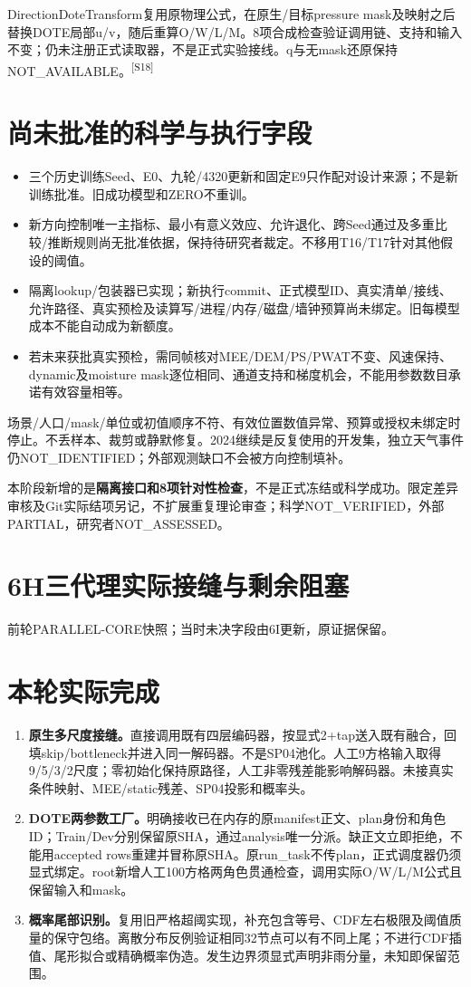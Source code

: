 \documentclass[UTF8,10.5pt,a4paper,fontset=none]{ctexart}
\newcommand{\evi}[1]{\textsuperscript{\color{muted}[#1]}}
\newcommand{\pageheading}[2]{\clearpage\section*{#1}\textcolor{muted}{#2}\par\vspace{3pt}}
\begin{document}
DirectionDoteTransform复用原物理公式，在原生/目标pressure mask及映射之后替换DOTE局部u/v，随后重算O/W/L/M。8项合成检查验证调用链、支持和输入不变；仍未注册正式读取器，不是正式实验接线。q与无mask还原保持NOT\_AVAILABLE。\evi{S18}

\section*{尚未批准的科学与执行字段}
\begin{itemize}
\item 三个历史训练Seed、E0、九轮/4320更新和固定E9只作配对设计来源；不是新训练批准。旧成功模型和ZERO不重训。
\item 新方向控制唯一主指标、最小有意义效应、允许退化、跨Seed通过及多重比较/推断规则尚无批准依据，保持待研究者裁定。不移用T16/T17针对其他假设的阈值。
\item 隔离lookup/包装器已实现；新执行commit、正式模型ID、真实清单/接线、允许路径、真实预检及读算写/进程/内存/磁盘/墙钟预算尚未绑定。旧每模型成本不能自动成为新额度。
\item 若未来获批真实预检，需同帧核对MEE/DEM/PS/PWAT不变、风速保持、dynamic及moisture mask逐位相同、通道支持和梯度机会，不能用参数数目承诺有效容量相等。
\end{itemize}

场景/人口/mask/单位或初值顺序不符、有效位置数值异常、预算或授权未绑定时停止。不丢样本、裁剪或静默修复。2024继续是反复使用的开发集，独立天气事件仍NOT\_IDENTIFIED；外部观测缺口不会被方向控制填补。

本阶段新增的是\textbf{隔离接口和8项针对性检查}，不是正式冻结或科学成功。限定差异审核及Git实际结项另记，不扩展重复理论审查；科学NOT\_VERIFIED，外部PARTIAL，研究者NOT\_ASSESSED。

\pageheading{6H\quad 三代理实际接缝与剩余阻塞}{前轮PARALLEL-CORE快照；当时未决字段由6I更新，原证据保留。}
\section*{本轮实际完成}
\begin{enumerate}[leftmargin=2em,itemsep=7pt]
\item \textbf{原生多尺度接缝。}直接调用既有四层编码器，按显式2+tap送入既有融合，回填skip/bottleneck并进入同一解码器。不是SP04池化。人工9方格输入取得9/5/3/2尺度；零初始化保持原路径，人工非零残差能影响解码器。未接真实条件映射、MEE/static残差、SP04投影和概率头。
\item \textbf{DOTE两参数工厂。}明确接收已在内存的原manifest正文、plan身份和角色ID；Train/Dev分别保留原SHA，通过analysis唯一分派。缺正文立即拒绝，不能用accepted rows重建并冒称原SHA。原run\_task不传plan，正式调度器仍须显式绑定。root新增人工100方格两角色贯通检查，调用实际O/W/L/M公式且保留输入和mask。
\item \textbf{概率尾部识别。}复用旧严格超阈实现，补充包含等号、CDF左右极限及阈值质量的保守包络。离散分布反例验证相同32节点可以有不同上尾；不进行CDF插值、尾形拟合或精确概率伪造。发生边界须显式声明非雨分量，未知即保留范围。
\end{enumerate}
\end{document}
